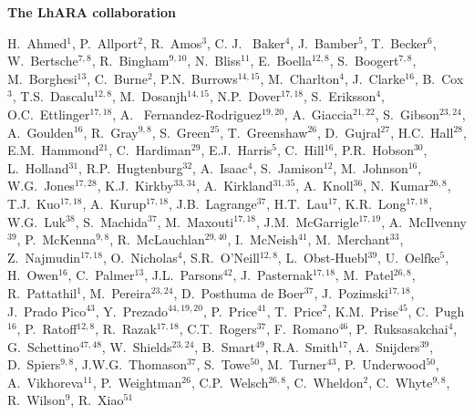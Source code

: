 \vspace{0.75cm}
\begin{center}
  {\bf \color{BlueViolet} The LhARA collaboration} \\
  \vspace{0.25cm}
\end{center}
\begin{center}
  H.~Ahmed$^{1}$,
  P.~Allport$^{2}$,
  R.~Amos$^{3}$,
  C. J. ~Baker$^{4}$,
  J.~Bamber$^{5}$,
  T.~Becker$^{6}$,
  W.~Bertsche$^{7,8}$,
  R.~Bingham$^{9,10}$,
  N.~Bliss$^{11}$,
  E.~Boella$^{12,8}$,
  S.~Boogert$^{7,8}$,
  M.~Borghesi$^{13}$,
  C.~Burne$^{2}$,
  P.N.~Burrows$^{14,15}$,
  M.~Charlton$^{4}$,
  J.~Clarke$^{16}$,
  B.~Cox$^{3}$,
  T.S.~Dascalu$^{12,8}$,
  M.~Dosanjh$^{14,15}$,
  N.P.~Dover$^{17,18}$,
  S.~Eriksson$^{4}$,
  O.C.~Ettlinger$^{17,18}$,
  A. ~Fernandez-Rodriguez$^{19,20}$,
  A.~Giaccia$^{21,22}$,
  S.~Gibson$^{23,24}$,
  A.~Goulden$^{16}$,
  R.~Gray$^{9,8}$,
  S.~Green$^{25}$,
  T.~Greenshaw$^{26}$,
  D.~Gujral$^{27}$,
  H.C.~Hall$^{28}$,
  E.M.~Hammond$^{21}$,
  C.~Hardiman$^{29}$,
  E.J.~Harris$^{5}$,
  C.~Hill$^{16}$,
  P.R.~Hobson$^{30}$,
  L.~Holland$^{31}$,
  R.P.~Hugtenburg$^{32}$,
  A.~Isaac$^{4}$,
  S.~Jamison$^{12}$,
  M.~Johnson$^{16}$,
  W.G.~Jones$^{17,28}$,
  K.J.~Kirkby$^{33,34}$,
  A.~Kirkland$^{31,35}$,
  A.~Knoll$^{36}$,
  N.~Kumar$^{26,8}$,
  T.J.~Kuo$^{17,18}$,
  A.~Kurup$^{17,18}$,
  J.B.~Lagrange$^{37}$,
  H.T.~Lau$^{17}$,
  K.R.~Long$^{17,18}$,
  W.G.~Luk$^{38}$,
  S.~Machida$^{37}$,
  M.~Maxouti$^{17,18}$,
  J.M.~McGarrigle$^{17,19}$,
  A.~McIlvenny$^{39}$,
  P.~McKenna$^{9,8}$,
  R.~McLauchlan$^{29,40}$,
  I.~McNeish$^{41}$,
  M.~Merchant$^{33}$,
  Z.~Najmudin$^{17,18}$,
  O.~Nicholas$^{4}$,
  S.R.~O'Neill$^{12,8}$,
  L.~Obst-Huebl$^{39}$,
  U.~Oelfke$^{5}$,
  H.~Owen$^{16}$,
  C.~Palmer$^{13}$,
  J.L.~Parsons$^{42}$,
  J.~Pasternak$^{17,18}$,
  M.~Patel$^{26,8}$,
  R.~Pattathil$^{1}$,
  M.~Pereira$^{23,24}$,
  D.~Posthuma de Boer$^{37}$,
  J.~Pozimski$^{17,18}$,
  J.~Prado Pico$^{43}$,
  Y.~Prezado$^{44,19,20}$,
  P.~Price$^{41}$,
  T.~Price$^{2}$,
  K.M.~Prise$^{45}$,
  C.~Pugh$^{16}$,
  P.~Ratoff$^{12,8}$,
  R.~Razak$^{17,18}$,
  C.T.~Rogers$^{37}$,
  F.~Romano$^{46}$,
  P.~Ruksasakchai$^{4}$,
  G.~Schettino$^{47,48}$,
  W.~Shields$^{23,24}$,
  B.~Smart$^{49}$,
  R.A.~Smith$^{17}$,
  A.~Snijders$^{39}$,
  D.~Spiers$^{9,8}$,
  J.W.G.~Thomason$^{37}$,
  S.~Towe$^{50}$,
  M.~Turner$^{43}$,
  P.~Underwood$^{50}$,
  A.~Vikhoreva$^{11}$,
  P.~Weightman$^{26}$,
  C.P.~Welsch$^{26,8}$,
  C.~Wheldon$^{2}$,
  C.~Whyte$^{9,8}$,
  R.~Wilson$^{9}$,
  R.~Xiao$^{51}$
\end{center}
